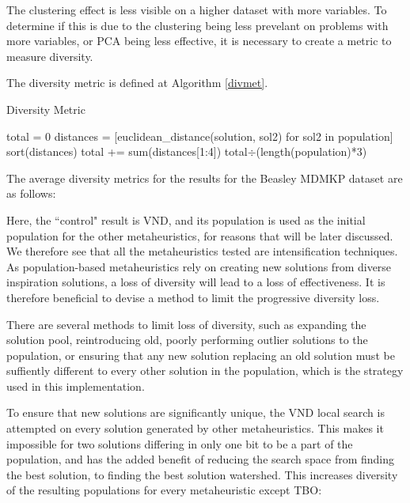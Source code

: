 \documentclass[11pt, letterpaper, onecolumn]{article}
\begin{document}
The clustering effect is less visible on a higher dataset with more variables. To determine if this is due to the clustering being less prevelant on problems with more variables, or PCA being less effective, it is necessary to create a metric to measure diversity. 

The diversity metric is defined at Algorithm \ref{divmet}. 



\begin{algorithm}
\caption{Diversity Metric}
\label{divmet}
\begin{algorithmic}
\STATE total = 0
\STATE distances = [euclidean\_distance(solution, sol2) for sol2 in population]
\STATE sort(distances)
\STATE total += sum(distances[1:4])
\ENDFOR
\RETURN total$\div$(length(population)*3)
\end{algorithmic}
\end{algorithm}

\clearpage
The average diversity metrics for the results for the Beasley MDMKP dataset are as follows:


\begin{table}[htbp]
\end{table}

Here, the ``control" result is VND, and its population is used as the initial population for the other metaheuristics, for reasons that will be later discussed. We therefore see that all the metaheuristics tested are intensification techniques. As population-based metaheuristics rely on creating new solutions from diverse inspiration solutions, a loss of diversity will lead to a loss of effectiveness. It is therefore beneficial to devise a method to limit the progressive diversity loss. 

There are several methods to limit loss of diversity, such as expanding the solution pool, reintroducing old, poorly performing outlier solutions to the population, or ensuring that any new solution replacing an old solution must be suffiently different to every other solution in the population, which is the strategy used in this implementation. 

To ensure that new solutions are significantly unique, the VND local search is attempted on every solution generated by other metaheuristics. This makes it impossible for two solutions differing in only one bit to be a part of the population, and has the added benefit of reducing the search space from finding the best solution, to finding the best solution watershed. This increases diversity of the resulting populations for every metaheuristic except TBO:
\end{document}
